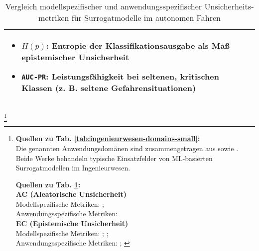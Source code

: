 \begin{otherlanguage}{ngerman}
\begin{table}[!htpb]
\begin{tabularx}{\textwidth}{|>{\centering\arraybackslash}l|X|X|}
\begin{itemize}[topsep=0em, itemsep=0em, leftmargin=*, label={}]
      \item \texttt{$H(p)$}: Entropie der Klassifikationsausgabe als Maß epistemischer Unsicherheit
      \item \texttt{AUC-PR}: Leistungsfähigkeit bei seltenen, kritischen Klassen (z. B. seltene Gefahrensituationen)
    \end{itemize}
    \\
    \hline
  \end{tabularx}
  \caption{Vergleich modellspezifischer und anwendungsspezifischer Unsicherheitsmetriken für Surrogatmodelle im autonomen Fahren}
  \label{tab:chapter6r71}
\end{table}

\footnote{%

\begin{minipage}[t]{\textwidth}
\scriptsize
\textbf{Quellen zu Tab. \ref{tab:ingenieurwesen-domains-small}:}\\[0.5em]
Die genannten Anwendungsdomänen sind zusammengetragen aus \parencite{Gawlikowski2023} sowie \parencite{Ulmer2023}. Beide Werke behandeln typische Einsatzfelder von ML-basierten Surrogatmodellen im Ingenieurwesen. 
\end{minipage}%
\vspace{0.125em}
\begin{minipage}[t]{\textwidth}
\scriptsize
\textbf{Quellen zu Tab. \ref{tab:chapter6r71}:}\\[0.5em]
\textbf{AC (Aleatorische Unsicherheit)}\\
\quad Modellspezifische Metriken: \parencite[S.~224–226]{bishop2006pattern}; \parencite[Kap.~2]{rasmussen2006gaussian} \\
\quad Anwendungsspezifische Metriken: \parencite[S.~40–42]{bishop2006pattern} \\[0.5em]

\textbf{EC (Epistemische Unsicherheit)}\\
\quad Modellspezifische Metriken: \parencite[S.~40–42]{gal2016uncertainty}; \parencite{blundell2015weight}; \parencite{sensoy2018evidential} \\
\quad Anwendungsspezifische Metriken: \parencite[S.~233–235]{bishop2006pattern}; \parencite{ovadia2019can}
\end{minipage}%
}


\pagebreak



\end{otherlanguage}
